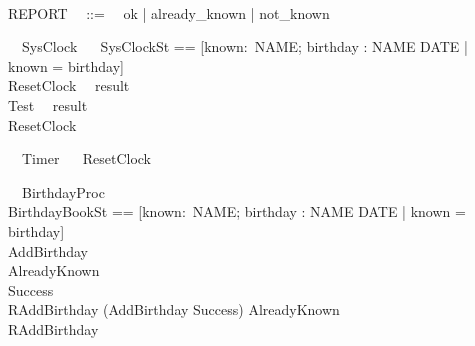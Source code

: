 \documentclass{llncs}
\begin{document}
\begin{zed}
\\
  REPORT ~~::=~~ ok | already\_known | not\_known\\
\end{zed}
\begin{circus}
\circprocess\ ~SysClock ~\circdef~ 
\circbegin
\circstate SysClockSt == [known:\power~NAME; birthday : NAME \pfun DATE | known = \dom birthday]\\
  ResetClock ~\circdef~result \then \Skip\\
  Test ~\circdef~result \then \Skip\\
  \circspot ResetClock
  \circend
\end{circus}
\begin{circus}%
  \circprocess\ ~Timer ~\circdef~\circbegin
  ResetClock ~\circdef~\Skip
  \circspot \Skip
  \circend
\end{circus}
\begin{circus}%
  \circprocess\ ~BirthdayProc ~\circdef~\circbegin\\
  \circstate BirthdayBookSt == [known:\power~NAME; birthday : NAME \pfun DATE | known = \dom birthday]\\
  AddBirthday \circdef [ \Delta BirthdayBook; name? : NAME; date? : DATE | name? \notin known \land birthday' = birthday \cup \{name? \mapsto date?\} ]\\
  AlreadyKnown \circdef [ \Xi BirthdayBook; name? : NAME; result! : REPORT | name? \in known \land result! = already\_known ]\\
  Success \circdef [result! : REPORT | result! = ok ]\\
  RAddBirthday \circdef (AddBirthday \land Success) \lor AlreadyKnown\\
  \circspot RAddBirthday\\
  \circend
\end{circus}
\end{document}

